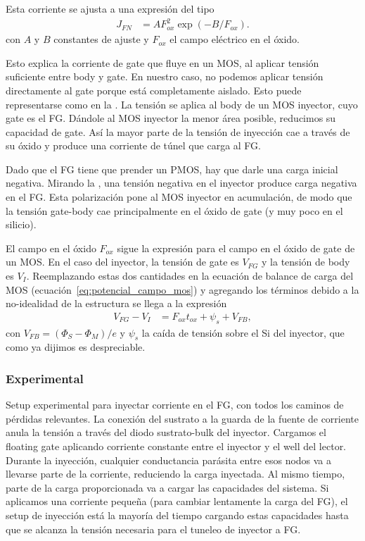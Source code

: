 Esta corriente se ajusta a una expresión del tipo
\begin{align*}
    J_{FN} &= AF_{ox}^2\exp(-B/F_{ox}).
\end{align*}
con $A$ y $B$ constantes de ajuste 
y $F_{ox}$ el campo eléctrico en el óxido.

Esto explica la corriente de gate que fluye en un MOS,
al aplicar tensión suficiente entre body y gate.
En nuestro caso, no podemos aplicar tensión directamente al gate
porque está completamente aislado.
Esto puede representarse como en la .
La tensión se aplica al body de un MOS inyector,
cuyo gate es el FG.
Dándole al MOS inyector la menor área posible, 
reducimos su capacidad de gate.
Así la mayor parte de la tensión de inyección cae a través de su óxido
y produce una corriente de túnel que carga al FG.

Dado que el FG tiene que prender un PMOS,
hay que darle una carga inicial negativa.
Mirando la ,
una tensión negativa en el inyector
produce carga negativa en el FG.
Esta polarización pone al MOS inyector en acumulación,
de modo que la tensión gate-body cae principalmente 
en el óxido de gate (y muy poco en el silicio).

El campo en el óxido $F_{ox}$ sigue la expresión para el campo en el óxido
de gate de un MOS.
En el caso del inyector, la tensión de gate es $V_{FG}$
y la tensión de body es $V_I$.
Reemplazando estas dos cantidades en la ecuación de balance de carga
del MOS (ecuación~\ref{eq:potencial_campo_mos})
y agregando los términos debido a la no-idealidad de la estructura
se llega a la expresión
\begin{align*}
    V_{FG}-V_I &= F_{ox}t_{ox}+\psi_s+V_{FB},
\end{align*}
con $V_{FB}=(\Phi_S-\Phi_M)/e$ 
y $\psi_s$ la caída de tensión sobre el Si del inyector,
que como ya dijimos es despreciable.
%
\subsubsection{Experimental}
{Setup experimental para inyectar corriente en el FG,
con todos los caminos de pérdidas relevantes.
La conexión del sustrato a la guarda de la fuente de corriente
anula la tensión a través del diodo sustrato-bulk del inyector.}
Cargamos el floating gate aplicando corriente constante
entre el inyector y el well del lector.
Durante la inyección,
cualquier conductancia parásita entre esos nodos 
va a llevarse parte de la corriente,
reduciendo la carga inyectada.
Al mismo tiempo, parte de la carga proporcionada
va a cargar las capacidades del sistema.
Si aplicamos una corriente pequeña
(para cambiar lentamente la carga del FG),
el setup de inyección está la mayoría del tiempo cargando estas capacidades
hasta que se alcanza la tensión necesaria para el tuneleo de inyector a FG.

